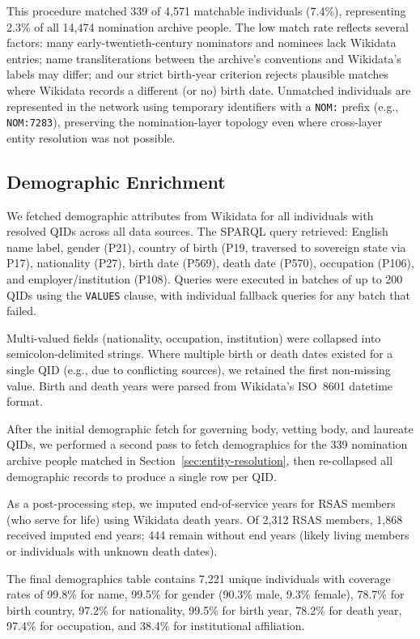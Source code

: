 This procedure matched 339 of 4{,}571 matchable individuals (7.4\%),
representing 2.3\% of all 14{,}474 nomination archive people. The low
match rate reflects several factors: many early-twentieth-century
nominators and nominees lack Wikidata entries; name transliterations
between the archive's conventions and Wikidata's labels may differ; and
our strict birth-year criterion rejects plausible matches where Wikidata
records a different (or no) birth date. Unmatched individuals are
represented in the network using temporary identifiers with a \texttt{NOM:}
prefix (e.g., \texttt{NOM:7283}), preserving the nomination-layer topology
even where cross-layer entity resolution was not possible.

\subsection{Demographic Enrichment}\label{sec:demographics}

We fetched demographic attributes from Wikidata for all individuals with
resolved QIDs across all data sources. The SPARQL query retrieved: English
name label, gender (P21), country of birth (P19, traversed to sovereign
state via P17), nationality (P27), birth date (P569), death date (P570),
occupation (P106), and employer/institution (P108). Queries were executed
in batches of up to 200 QIDs using the \texttt{VALUES} clause, with
individual fallback queries for any batch that failed.

Multi-valued fields (nationality, occupation, institution) were collapsed
into semicolon-delimited strings. Where multiple birth or death dates
existed for a single QID (e.g., due to conflicting sources), we retained
the first non-missing value. Birth and death years were parsed from
Wikidata's ISO~8601 datetime format.

After the initial demographic fetch for governing body, vetting body, and
laureate QIDs, we performed a second pass to fetch demographics for the
339 nomination archive people matched in Section~\ref{sec:entity-resolution},
then re-collapsed all demographic records to produce a single row per QID.

As a post-processing step, we imputed end-of-service years for RSAS members
(who serve for life) using Wikidata death years. Of 2{,}312 RSAS members,
1{,}868 received imputed end years; 444 remain without end years (likely
living members or individuals with unknown death dates).

The final demographics table contains 7{,}221 unique individuals with
coverage rates of 99.8\% for name, 99.5\% for gender (90.3\% male, 9.3\%
female), 78.7\% for birth country, 97.2\% for nationality, 99.5\% for
birth year, 78.2\% for death year, 97.4\% for occupation, and 38.4\% for
institutional affiliation.

